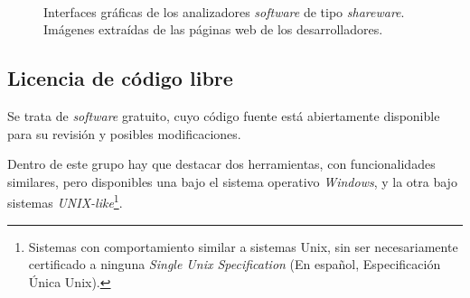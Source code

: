 \begin{figure}[htbp]
    \centering
     \\
    \caption{Interfaces gráficas de los analizadores \emph{software} de tipo \emph{shareware}. Imágenes extraídas de las páginas web de los desarrolladores.} 
    \label{fig:matriz-gui-close-sw}
\end{figure}


\subsection{Licencia de código libre}
Se trata de \emph{software} gratuito, cuyo código fuente está abiertamente disponible para su revisión y posibles modificaciones\cite{gonzalez2003introduccion}.

Dentro de este grupo hay que destacar dos herramientas, con funcionalidades similares, pero disponibles una bajo el sistema operativo \emph{Windows\texttrademark}, y la otra bajo sistemas \emph{UNIX-like}\footnote{Sistemas con comportamiento similar a sistemas Unix, sin ser necesariamente certificado a ninguna \emph{Single Unix Specification} (En español, Especificación Única Unix).}.

